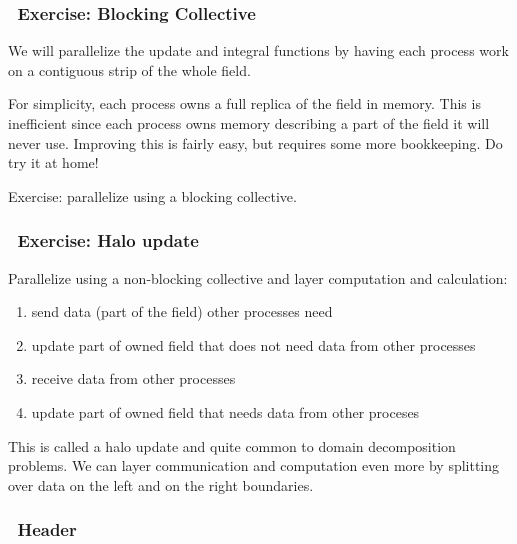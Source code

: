 \subsubsection{~Exercise: Blocking
Collective}\label{exercise-blocking-collective}

We will parallelize the update and integral functions by having each
process work on a contiguous strip of the whole field.

For simplicity, each process owns a full replica of the field in memory.
This is inefficient since each process owns memory describing a part of
the field it will never use. Improving this is fairly easy, but requires
some more bookkeeping. Do try it at home!

Exercise: parallelize using a blocking collective.

\subsubsection{~Exercise: Halo update}\label{exercise-halo-update}

Parallelize using a non-blocking collective and layer computation and
calculation:

\begin{enumerate}
\def\labelenumi{\arabic{enumi}.}
\itemsep1pt\parskip0pt
\item
  send data (part of the field) other processes need
\item
  update part of owned field that does not need data from other
  processes
\item
  receive data from other processes
\item
  update part of owned field that needs data from other proceses
\end{enumerate}

This is called a halo update and quite common to domain decomposition
problems. We can layer communication and computation even more by
splitting over data on the left and on the right boundaries.

\subsubsection{~Header}\label{header-1}

